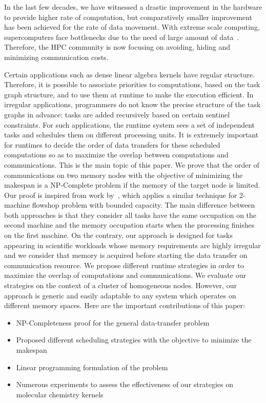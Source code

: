 \documentclass[sigconf]{acmart}
\begin{document}
	
	In the last few decades, we have witnessed a drastic improvement in the hardware to provide higher rate of computation, but comparatively smaller improvement has been achieved for the rate of data movement. With extreme scale computing, supercomputers face bottlenecks due to the need of large amount of data~\cite{ascaccommitteereport2014,yelick2016}. Therefore, the HPC community is now focusing on avoiding, hiding and minimizing communication costs.
	
	
	Certain applications such as dense linear algebra kernels have regular structure. Therefore, it is possible to associate priorities to computations, based on the task graph structure, and to use them at runtime to make the execution efficient. In irregular applications, programmers do not know the precise structure of the task graphs in advance: tasks are added recursively based on certain sentinel constraints. For such applications, the runtime system sees a set of independent tasks and schedules them on different processing units. It is extremely important for runtimes to decide the order of data transfers for these scheduled computations so as to maximize the overlap between computations and communications. This is the main topic of this paper. We prove that the order of communications on two memory nodes with the objective of minimizing the makespan is a NP-Complete problem if the memory of the target node is limited. Our proof is inspired from work by~\cite{Papadimitriou:1980:FSL:322203.322213}, which applies a similar technique for 2-machine flowshop problem with bounded capacity. The main difference between both approaches is that they consider all tasks have the same occupation on the second machine and the memory occupation starts when the processing finishes on the first machine. On the contrary, our approach is designed for tasks appearing in scientific workloads whose memory requirements are highly irregular and we consider that memory is acquired before starting the data transfer on communication resource. We propose different runtime strategies in order to maximize the overlap of computations and communications. We evaluate our strategies on the context of a cluster of homogeneous nodes. However, our approach is generic and easily adaptable to any system which operates on different memory spaces. Here are the important contributions of this paper:
	
	
	\renewcommand{\labelitemi}{$\bullet$}
	\begin{itemize}
		\item NP-Completeness proof for the general data-transfer problem 
		\item Proposed different scheduling strategies with the objective to minimize the makespan
		\item Linear programming formulation of the problem
		\item Numerous experiments to assess the effectiveness of our strategies on molecular chemistry kernels 
	\end{itemize}
	
\end{document}
